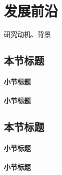 \chapter{发展前沿}
研究动机、背景

\section{本节标题}

\subsubsection{小节标题}

\subsubsection{小节标题}

\section{本节标题}

\subsubsection{小节标题}

\subsubsection{小节标题}

